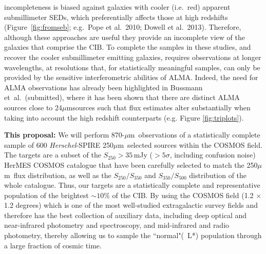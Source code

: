 \documentclass[12pt,a4paper]{article}
\newcommand{\herschel}{{\it Herschel}}
\newcommand{\ea}{et~al.}
\newcommand{\micron}{$\mu$m}
\begin{document}
incompleteness is biased against galaxies with cooler (i.e.\ red) apparent
submillimeter SEDs, which preferentially affects those at
high redshifts (Figure~\ref{fig:fromseb}; e.g.\ Pope et al.\ 2010; Dowell et al.\ 2013). Therefore, although these
approaches are useful they provide an incomplete view of the galaxies
that comprise the CIB. To complete the samples in these studies, and recover the cooler
submillimeter emitting galaxies, requires observations at longer
wavelengths, at resolutions that, for statistically meaningful samples, can only be provided by
the sensitive interferometric abilities of ALMA. Indeed, the need for ALMA observations has already been highlighted in Bussmann \ea\  (submitted), where it has been shown that there are distinct ALMA sources close to 24\micron sources such that flux estimates alter substantially when taking into account the high redshift counterparts (e.g. Figure \ref{fig:triplots}).

{\bf This proposal:}
%
We will perform 870-\micron\ observations of a statistically complete
sample of 600 \herschel-SPIRE 250\micron\ selected sources within the COSMOS field. The
targets are a subset of the $S_{250}>35$\,mJy ($>5\sigma$, including
confusion noise) HerMES COSMOS catalogue that have been carefully selected
to match the 250\micron\ flux distribution, as well as the
$S_{250}/S_{350}$ and $S_{350}/S_{500}$ distribution of the whole
catalogue. Thus, our targets are a statistically complete and
representative population of the brightest $\sim10\%$ of the CIB. By using the COSMOS field (1.2 $\times$ 1.2 degrees) which is one of the most well-studied extragalactic survey
fields and therefore has the best collection of auxiliary data, including deep optical and
near-infrared photometry and spectroscopy, and mid-infrared and radio
photometry, thereby allowing us to sample the ``normal"(~L*) population through a large fraction of cosmic time. 
\vspace{0.2cm}
\end{document}
